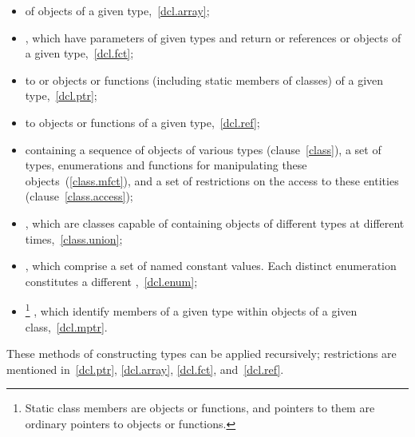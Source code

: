\begin{itemize}
\item {}%
 of objects of a given type,~\ref{dcl.array};

\item {}%
, which have parameters of given types and return
 or references or objects of a given type,~\ref{dcl.fct};

\item {}%
 to  or objects or functions (including
static members of classes) of a given type,~\ref{dcl.ptr};

\item %
%
 to objects or functions of a given type,~\ref{dcl.ref};

\item {}%
 containing a sequence of objects of various types
(clause~\ref{class}), a set of types, enumerations and functions for
manipulating these objects~(\ref{class.mfct}), and a set of restrictions
on the access to these entities (clause~\ref{class.access});

\item {}%
, which are classes capable of containing objects of
different types at different times,~\ref{class.union};

\item {}%
, which comprise a set of named constant values.
Each distinct enumeration constitutes a different
%
,~\ref{dcl.enum};

\item {}%
%
\footnote{Static class members are objects or functions, and pointers to them are
ordinary pointers to objects or functions.}
, which identify members of a given
type within objects of a given class,~\ref{dcl.mptr}.
\end{itemize}

\pnum
These methods of constructing types can be applied recursively;
restrictions are mentioned in~\ref{dcl.ptr}, \ref{dcl.array},
\ref{dcl.fct}, and~\ref{dcl.ref}.

